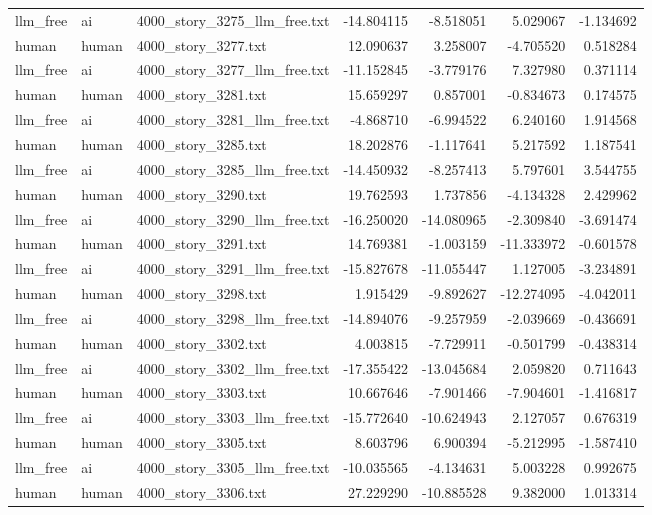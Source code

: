 \begin{longtable}{lllrrrr}
llm\_free & ai & 4000\_story\_3275\_llm\_free.txt & -14.804115 & -8.518051 & 5.029067 & -1.134692 \\
human & human & 4000\_story\_3277.txt & 12.090637 & 3.258007 & -4.705520 & 0.518284 \\
llm\_free & ai & 4000\_story\_3277\_llm\_free.txt & -11.152845 & -3.779176 & 7.327980 & 0.371114 \\
human & human & 4000\_story\_3281.txt & 15.659297 & 0.857001 & -0.834673 & 0.174575 \\
llm\_free & ai & 4000\_story\_3281\_llm\_free.txt & -4.868710 & -6.994522 & 6.240160 & 1.914568 \\
human & human & 4000\_story\_3285.txt & 18.202876 & -1.117641 & 5.217592 & 1.187541 \\
llm\_free & ai & 4000\_story\_3285\_llm\_free.txt & -14.450932 & -8.257413 & 5.797601 & 3.544755 \\
human & human & 4000\_story\_3290.txt & 19.762593 & 1.737856 & -4.134328 & 2.429962 \\
llm\_free & ai & 4000\_story\_3290\_llm\_free.txt & -16.250020 & -14.080965 & -2.309840 & -3.691474 \\
human & human & 4000\_story\_3291.txt & 14.769381 & -1.003159 & -11.333972 & -0.601578 \\
llm\_free & ai & 4000\_story\_3291\_llm\_free.txt & -15.827678 & -11.055447 & 1.127005 & -3.234891 \\
human & human & 4000\_story\_3298.txt & 1.915429 & -9.892627 & -12.274095 & -4.042011 \\
llm\_free & ai & 4000\_story\_3298\_llm\_free.txt & -14.894076 & -9.257959 & -2.039669 & -0.436691 \\
human & human & 4000\_story\_3302.txt & 4.003815 & -7.729911 & -0.501799 & -0.438314 \\
llm\_free & ai & 4000\_story\_3302\_llm\_free.txt & -17.355422 & -13.045684 & 2.059820 & 0.711643 \\
human & human & 4000\_story\_3303.txt & 10.667646 & -7.901466 & -7.904601 & -1.416817 \\
llm\_free & ai & 4000\_story\_3303\_llm\_free.txt & -15.772640 & -10.624943 & 2.127057 & 0.676319 \\
human & human & 4000\_story\_3305.txt & 8.603796 & 6.900394 & -5.212995 & -1.587410 \\
llm\_free & ai & 4000\_story\_3305\_llm\_free.txt & -10.035565 & -4.134631 & 5.003228 & 0.992675 \\
human & human & 4000\_story\_3306.txt & 27.229290 & -10.885528 & 9.382000 & 1.013314 \\

\end{longtable}
